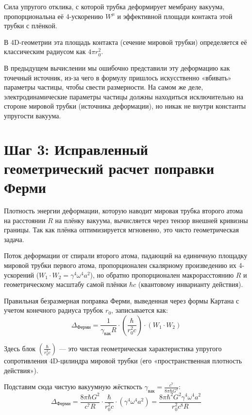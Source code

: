 \documentclass[12pt,a4paper]{article}
\begin{document}
Сила упругого отклика, с которой трубка деформирует мембрану вакуума, пропорциональна её 4-ускорению $W^\mu$ и эффективной площади контакта этой трубки с плёнкой.

В 4D-геометрии эта площадь контакта (сечение мировой трубки) определяется её классическим радиусом как $4\pi r_0^2$.

В предыдущем вычислении мы ошибочно представили эту деформацию как точечный источник, из-за чего в формулу пришлось искусственно «вбивать» параметры частицы, чтобы свести размерности. На самом же деле, электродинамические параметры частицы должны находиться исключительно на стороне мировой трубки (источника деформации), но никак не внутри константы упругости вакуума.

\section*{Шаг 3: Исправленный геометрический расчет поправки Ферми}

Плотность энергии деформации, которую наводит мировая трубка второго атома на расстоянии $R$ на плёнку вакуума, вычисляется через тензор внешней кривизны границы. Так как плёнка оптимизируется мгновенно, это чисто геометрическая задача.

Поток деформации от спирали второго атома, падающий на единичную площадку мировой трубки первого атома, пропорционален скалярному произведению их 4-ускорений ($W_1 \cdot W_2 = \gamma^4 \omega^4 a^2$), но обратно пропорционален макрорасстоянию $R$ и геометрическому масштабу самой плёнки $\hbar c$ (квантовому инварианту действия).

Правильная безразмерная поправка Ферми, выведенная через формы Картана с учетом конечного радиуса трубок $r_0$, записывается как:
\begin{equation}
\Delta_{Ферми} = \frac{1}{\gamma_{вак} R} \cdot \left( \frac{\hbar}{r_0^2 c} \right) \cdot (W_1 \cdot W_2)
\end{equation}

Здесь блок $\left( \frac{\hbar}{r_0^2 c} \right)$ — это чистая геометрическая характеристика упругого сопротивления 4D-цилиндра мировой трубки (его «пространственная плотность действия»).

Подставим сюда чистую вакуумную жёсткость $\gamma_{вак} = \frac{c^7}{8\pi \hbar G^2}$:
\begin{equation}
\Delta_{Ферми} = \frac{8\pi \hbar G^2}{c^7 R} \cdot \frac{\hbar}{r_0^2 c} \cdot (\gamma^4 \omega^4 a^2) = \frac{8\pi \hbar^2 G^2 \gamma^4 \omega^4 a^2}{r_0^2 c^8 R}
\end{equation}
\end{document}

